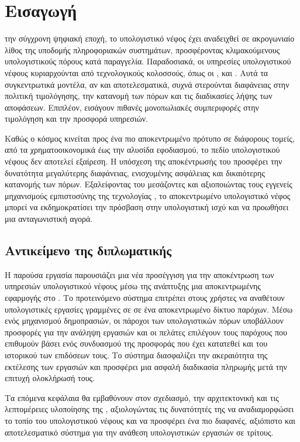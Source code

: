 \chapter{Εισαγωγή} 
την σύγχρονη ψηφιακή εποχή, το υπολογιστικό νέφος 
 έχει αναδειχθεί σε ακρογωνιαίο λίθος της υποδομής
πληροφοριακών συστημάτων, προσφέροντας κλιμακούμενους υπολογιστικούς
πόρους κατά παραγγελία. Παραδοσιακά, οι υπηρεσίες υπολογιστικού νέφους 
κυριαρχούνται από τεχνολογικούς κολοσσούς, όπως οι ,  και 
. Αυτά τα συγκεντρωτικά μοντέλα, αν 
και αποτελεσματικά, συχνά στερούνται διαφάνειας στην πολιτική τιμολόγησης, 
την κατανομή των πόρων και τις διαδικασίες λήψης των αποφάσεων. 
Επιπλέον, εισάγουν πιθανές μονοπωλιακές  συμπεριφορές στην τιμολόγηση
και την προσφορά υπηρεσιών.
 
Καθώς ο κόσμος κινείται προς ένα πιο αποκεντρωμένο πρότυπο σε διάφορους 
τομείς, από τα χρηματοοικονομικά έως την αλυσίδα εφοδιασμού, το πεδίο 
υπολογιστικού νέφους δεν αποτελεί εξαίρεση. Η υπόσχεση της αποκέντρωσής 
του προσφέρει την δυνατότητα μεγαλύτερης διαφάνειας, ενισχυμένης ασφάλειας 
και δικαιότερης κατανομής των πόρων. Εξαλείφοντας του μεσάζοντες και 
αξιοποιώντας τους εγγενείς μηχανισμούς εμπιστοσύνης της τεχνολογίας 
, το αποκεντρωμένο υπολογιστικό νέφος μπορεί να εκδημοκρατίσει 
την πρόσβαση στην υπολογιστική ισχύ και να προωθήσει μια ανταγωνιστική 
αγορά.


\section{Αντικείμενο της διπλωματικής}
Η παρούσα εργασία παρουσιάζει μια νέα προσέγγιση για την αποκέντρωση 
των υπηρεσιών υπολογιστικού νέφους μέσω της ανάπτυξης μια αποκεντρωμένης 
εφαρμογής  στο . 
Το προτεινόμενο σύστημα επιτρέπει στους χρήστες να αναθέτουν υπολογιστικές 
εργασίες γραμμένες σε  σε ένα αποκεντρωμένο δίκτυο παρόχων. 
Μέσω ενός μηχανισμού δημοπρασιών, οι πάροχοι των υπολογιστικών πόρων 
υποβάλλουν προσφορές για την ανάληψη εργασιών και οι πελάτες επιλέγουν 
τους παρόχους που επιθυμούν βάσει ενός συνδυασμού της προσφοράς που έχει 
κατατεθεί και του ιστορικού των επιδόσεων τους. Το σύστημα διασφαλίζει την 
ακεραιότητα της εκτέλεσης των εργασιών και προσφέρει μια ασφαλή διαδικασία 
πληρωμής μετά την επιτυχή ολοκλήρωσή τους.

Τα επόμενα κεφάλαια θα εμβαθύνουν στον σχεδιασμό, την αρχιτεκτονική και 
τις λεπτομέρειες υλοποίησης της , αξιολογώντας τις δυνατότητές της 
να αναδιαμορφώσει το τοπίο του υπολογιστικού νέφους και να προσφέρει ένα 
πιο διαφανές, αξιόπιστο και αποτελεσματικό σύστημα για την ανάθεση 
υπολογιστικών εργασιών σε τρίτους.



